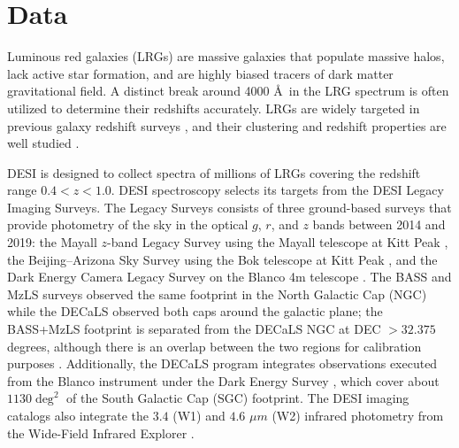 \section{Data}
\label{sec:data}

Luminous red galaxies (LRGs) are massive galaxies that populate massive halos, lack active star formation, and are highly biased tracers of dark matter gravitational field. A distinct break around 4000 \AA~in the LRG spectrum is often utilized to determine their redshifts accurately. LRGs are widely targeted in previous galaxy redshift surveys \citep[see, e.g.,][]{eisenstein2001spectroscopic, prakash2016sdss}, and their clustering and redshift properties are well studied \citep[see, e.g.,][]{ross2020MNRAS.498.2354R, gilmarin2020MNRAS.498.2492G, bautista2021MNRAS.500..736B, chapman2022MNRAS.516..617C}. 

DESI is designed to collect spectra of millions of LRGs covering the redshift range $0.4<z<1.0$. DESI spectroscopy selects its targets from the DESI Legacy Imaging Surveys. The Legacy Surveys consists of three ground-based surveys that provide photometry of the sky in the optical $g$, $r$, and $z$ bands between 2014 and 2019: the Mayall $z$-band Legacy Survey using the Mayall telescope at Kitt Peak \citep[MzLS;][]{dey2018overview}, the Beijing–Arizona Sky Survey using the Bok telescope at Kitt Peak \citep[BASS;][]{zou2017project}, and the Dark Energy Camera Legacy Survey on the Blanco 4m telescope \citep[DECaLS][]{flaugher2015dark}. The BASS and MzLS surveys observed the same footprint in the North Galactic Cap (NGC) while the DECaLS observed both caps around the galactic plane; the BASS+MzLS footprint is separated from the DECaLS NGC at DEC $> 32.375$ degrees, although there is an overlap between the two regions for calibration purposes \citep{dey2018overview}. Additionally, the DECaLS program integrates observations executed from the Blanco instrument under the Dark Energy Survey \citep{abbott2016dark}, which cover about $1130 \deg^{2}$ of the South Galactic Cap (SGC) footprint. The DESI imaging catalogs also integrate the $3.4$ (W1) and $4.6$ $\mu m$ (W2) infrared photometry from the Wide-Field Infrared Explorer \citep[WISE;][]{wise2010AJ....140.1868W, meisner2018RNAAS...2....1M}.  

